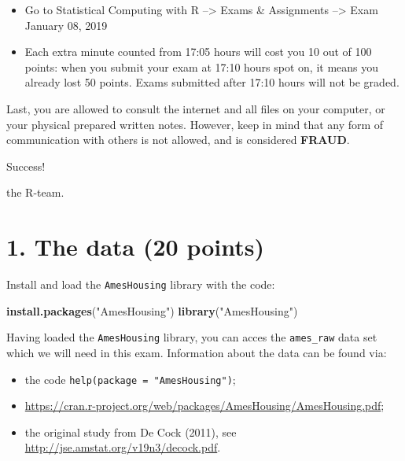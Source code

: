 \documentclass[]{article}
\newenvironment{Shaded}{\begin{snugshade}}{\end{snugshade}}
\newcommand{\KeywordTok}[1]{\textcolor[rgb]{0.13,0.29,0.53}{\textbf{#1}}}
\newcommand{\StringTok}[1]{\textcolor[rgb]{0.31,0.60,0.02}{#1}}
\newcommand{\NormalTok}[1]{#1}
\begin{document}
\begin{itemize}
\item
  Go to Statistical Computing with R --\textgreater{} Exams \&
  Assignments --\textgreater{} Exam January 08, 2019
\item
  Each extra minute counted from 17:05 hours will cost you 10 out of 100
  points: when you submit your exam at 17:10 hours spot on, it means you
  already lost 50 points. Exams submitted after 17:10 hours will not be
  graded.
\end{itemize}

Last, you are allowed to consult the internet and all files on your
computer, or your physical prepared written notes. However, keep in mind
that any form of communication with others is not allowed, and is
considered \textbf{FRAUD}.

Success!

the R-team.

\newpage

\null\thispagestyle{empty}\newpage

\section{1. The data (20 points)}\label{the-data-20-points}

Install and load the \texttt{AmesHousing} library with the code:

\begin{Shaded}
\begin{Highlighting}[]
\KeywordTok{install.packages}\NormalTok{(}\StringTok{"AmesHousing"}\NormalTok{)}
\KeywordTok{library}\NormalTok{(}\StringTok{"AmesHousing"}\NormalTok{)}
\end{Highlighting}
\end{Shaded}

Having loaded the \texttt{AmesHousing} library, you can acces the
\texttt{ames\_raw} data set which we will need in this exam. Information
about the data can be found via:

\begin{itemize}
\item
  the code \texttt{help(package\ =\ "AmesHousing")};
\item
  \url{https://cran.r-project.org/web/packages/AmesHousing/AmesHousing.pdf};
\item
  the original study from De Cock (2011), see
  \url{http://jse.amstat.org/v19n3/decock.pdf}.
\end{itemize}
\end{document}
